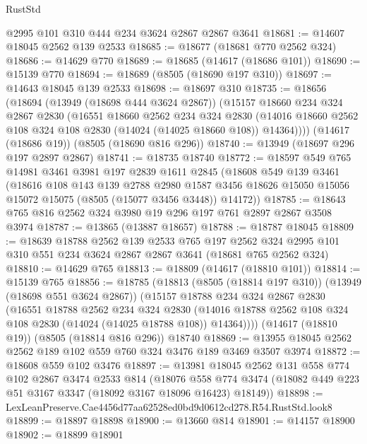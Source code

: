 \begin{lexlean}{RustStd}
\begin{coremodule}
    @2995
    @101
    @310
    @444
    @234
    @3624
    @2867
    @2867
    @3641
@18681 := @14607 @18045 @2562 @139 @2533
@18685 := @18677 (@18681 @770 @2562 @324)
@18686 := @14629 @770
@18689 := @18685 (@14617 (@18686 @101))
@18690 := @15139 @770
@18694 := @18689 (@8505 (@18690 @197 @310))
@18697 := @14643 @18045 @139 @2533
@18698 := @18697 @310
@18735 := @18656
    (@18694
      (@13949 (@18698 @444 @3624 @2867))
      (@15157
        @18660
        @234
        @324
        @2867
        @2830
        (@16551
          @18660
          @2562
          @234
          @324
          @2830
          (@14016 @18660 @2562 @108 @324 @108 @2830 (@14024 (@14025 @18660 @108)) @14364))))
    (@14617 (@18686 @19))
    (@8505 (@18690 @816 @296))
@18740 := @13949 (@18697 @296 @197 @2897 @2867)
@18741 := @18735 @18740
@18772 := @18597
    @549
    @765
    @14981
    @3461
    @3981
    @197
    @2839
    @1611
    @2845
    (@18608
      @549
      @139
      @3461
      (@18616
        @108
        @143
        @139
        @2788
        @2980
        @1587
        @3456
        @18626
        @15050
        @15056
        @15072
        @15075
        (@8505 (@15077 @3456 @3448))
        @14172))
@18785 := @18643 @765 @816 @2562 @324 @3980 @19 @296 @197 @761 @2897 @2867 @3508 @3974
@18787 := @13865 (@13887 @18657)
@18788 := @18787 @18045
@18809 := @18639
    @18788
    @2562
    @139
    @2533
    @765
    @197
    @2562
    @324
    @2995
    @101
    @310
    @551
    @234
    @3624
    @2867
    @2867
    @3641
    (@18681 @765 @2562 @324)
@18810 := @14629 @765
@18813 := @18809 (@14617 (@18810 @101))
@18814 := @15139 @765
@18856 := @18785
    (@18813
      (@8505 (@18814 @197 @310))
      (@13949 (@18698 @551 @3624 @2867))
      (@15157
        @18788
        @234
        @324
        @2867
        @2830
        (@16551
          @18788
          @2562
          @234
          @324
          @2830
          (@14016 @18788 @2562 @108 @324 @108 @2830 (@14024 (@14025 @18788 @108)) @14364))))
    (@14617 (@18810 @19))
    (@8505 (@18814 @816 @296))
    @18740
@18869 := @13955 @18045 @2562 @2562 @189 @102 @559 @760 @324 @3476 @189 @3469 @3507 @3974
@18872 := @18608 @559 @102 @3476
@18897 := @13981
    @18045
    @2562
    @131
    @558
    @774
    @102
    @2867
    @3474
    @2533
    @814
    (@18076 @558 @774 @3474 (@18082 @449 @223 @51 @3167 @3347 (@18092 @3167 @18096 @16423) @18149))
@18898 := LexLeanPreserve.Cae4456d77aa62528ed0bd9d0612cd278.R54.RustStd.look8
@18899 := @18897 @18898
@18900 := @13660 @814
@18901 := @14157 @18900
@18902 := @18899 @18901

\end{coremodule}
\end{lexlean}
